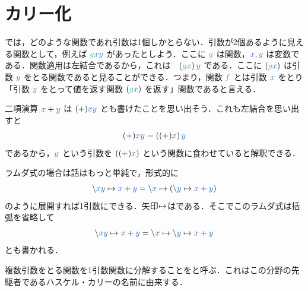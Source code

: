 \documentclass[a5paper,twoside,fleqn,draft]{jsbook}
\begin{document}
\section{カリー化}

\haskell では，どのような関数であれ引数は1個しかとらない．引数が2個あるように見える関数として，例えば $\hFunc{g}\hVar{x}\hVar{y}$ があったとしよう．ここに $\hFunc{g}$ は関数，$\hVar{x},\hVar{y}$ は変数である．関数適用は左結合であるから，これは　$\left(\hFunc{g}\hVar{x}\right)\hVar{y}$ である．ここに $\left(\hFunc{g}\hVar{x}\right)$ は引数 $\hVar{y}$ をとる関数であると見ることができる．つまり，関数 $\hFunc{f}$ とは引数 $\hVar{x}$ をとり「引数 $\hVar{y}$ をとって値を返す関数 $\left(\hFunc{g}\hVar{x}\right)$ を返す」関数であると言える．

二項演算 $\hVar{x}+\hVar{y}$ は $(+)\hVar{x}\hVar{y}$ とも書けたことを思い出そう．これも左結合を思い出すと
\begin{equation}
  (+)\hVar{x}\hVar{y}
  =\left((+)\hVar{x}\right)\hVar{y}
\end{equation}
であるから，$\hVar{y}$ という引数を $\left((+)\hVar{x}\right)$ という関数に食わせていると解釈できる．

ラムダ式の場合は話はもっと単純で，形式的に
\begin{equation}
  \hLambdaSyntax{\hVar{x}\hVar{y}}{\hVar{x}+\hVar{y}}
  =\hLambdaSyntax{\hVar{x}}{\left(\hLambdaSyntax{\hVar{y}}{\hVar{x}+\hVar{y}}\right)}
\end{equation}
のように展開すれば1引数にできる．矢印$\mapsto$はである．そこでこのラムダ式は括弧を省略して
\begin{equation}
  \hLambdaSyntax{\hVar{x}\hVar{y}}{\hVar{x}+\hVar{y}}
  =\hLambda\hVar{x}\hLambdaArrow\hLambda\hVar{y}\hLambdaArrow\hVar{x}+\hVar{y}
\end{equation}
とも書かれる．

複数引数をとる関数を1引数関数に分解することをと呼ぶ．これはこの分野の先駆者であるハスケル・カリーの名前に由来する．

\end{document}
